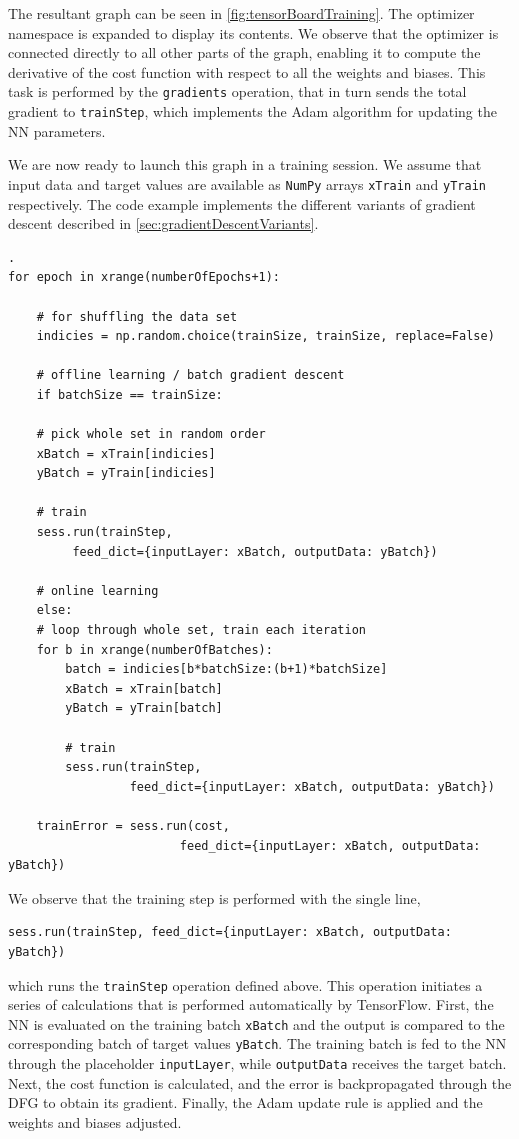 \documentclass[twoside,english]{uiofysmaster}
\begin{document}
The resultant graph can be seen in \autoref{fig:tensorBoardTraining}. 
The optimizer namespace is expanded to display its contents. 
We observe that the optimizer is connected directly to all other parts of the graph, enabling it
to compute the derivative of the cost function with respect to all the weights and biases. This task is
performed by the \texttt{gradients} operation, that in turn sends the total gradient to \texttt{trainStep}, 
which implements the Adam algorithm for updating the NN parameters. 

We are now ready to launch this graph in a training session. We assume that input data
and target values are available as \texttt{NumPy} arrays \texttt{xTrain} and \texttt{yTrain} respectively. 
The code example implements the different variants of gradient descent described in \autoref{sec:gradientDescentVariants}. 
\begin{verbatim}.
for epoch in xrange(numberOfEpochs+1): 
    
    # for shuffling the data set
    indicies = np.random.choice(trainSize, trainSize, replace=False)
    
    # offline learning / batch gradient descent
    if batchSize == trainSize:    
	
	# pick whole set in random order               
	xBatch = xTrain[indicies]
	yBatch = yTrain[indicies]
	
	# train
	sess.run(trainStep, 
		 feed_dict={inputLayer: xBatch, outputData: yBatch})
	
    # online learning
    else:                      
	# loop through whole set, train each iteration
	for b in xrange(numberOfBatches):
	    batch = indicies[b*batchSize:(b+1)*batchSize]
	    xBatch = xTrain[batch]
	    yBatch = yTrain[batch]
	    
	    # train
	    sess.run(trainStep, 
	             feed_dict={inputLayer: xBatch, outputData: yBatch})
	    
    trainError = sess.run(cost, 
                        feed_dict={inputLayer: xBatch, outputData: yBatch})
\end{verbatim}
We observe that the training step is performed with the single line,
\begin{verbatim}
sess.run(trainStep, feed_dict={inputLayer: xBatch, outputData: yBatch})
\end{verbatim}
which runs the \texttt{trainStep} operation defined above. This operation initiates a series of
calculations that is performed automatically by TensorFlow. 
First, the NN is evaluated on the training batch \texttt{xBatch} and the output is compared to the corresponding
batch of target values \texttt{yBatch}. The training batch is fed to the NN through the placeholder
\texttt{inputLayer}, while \texttt{outputData} receives the target batch. Next, the cost function 
is calculated, and the error is backpropagated through the DFG to obtain its gradient. Finally, 
the Adam update rule is applied and the weights and biases adjusted. 
\end{document}
